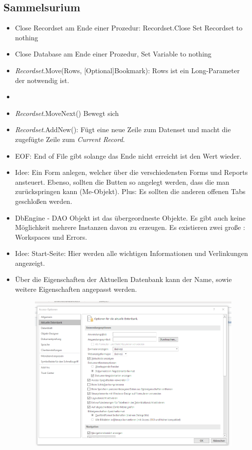 \subsection{Sammelsurium}
\begin{itemize}
\item Close Recordset am Ende einer Prozedur: Recordset.Close Set Recordset to nothing
\item Close Database am Ende einer Prozedur, Set Variable to nothing
\item \textit{Recordset}.Move(Rows, [Optional]Bookmark): Rows ist ein Long-Parameter der notwendig ist. 
\item \item \textit{Recordset}.MoveNext() Bewegt sich 
\item \textit{Recordset}.AddNew(): Fügt eine neue Zeile zum Datenset und macht die zugefügte Zeile zum \textit{Current Record}. 
\item EOF: End of File gibt solange das Ende nicht erreicht ist den Wert  wieder. 
\item Idee: Ein Form anlegen, welcher über die verschiedensten Forms und Reports ansteuert. Ebenso, sollten die Butten so angelegt werden, dass die man zurückspringen kann (Me-Objekt). Plus: Es sollten die anderen offenen Tabs geschloßen werden. 
\item DbEngine - DAO Objekt ist das übergeordneste Objekte. Es gibt auch keine Möglichkeit mehrere Instanzen davon zu erzeugen. Es existieren zwei große : Workspaces und Errors.
\item Idee: Start-Seite: Hier werden alle wichtigen Informationen und Verlinkungen angezeigt.
\item Über die Eigenschaften der Aktuellen Datenbank kann der Name, sowie weitere Eigenschaften angepasst werden.
\begin{figure}[H]
	\centering
	\includegraphics[scale = 0.3]{attachment/chapter_2/Scc064}
	\caption{}
	\label{fig:Scc064}
\end{figure}
\end{itemize}  

